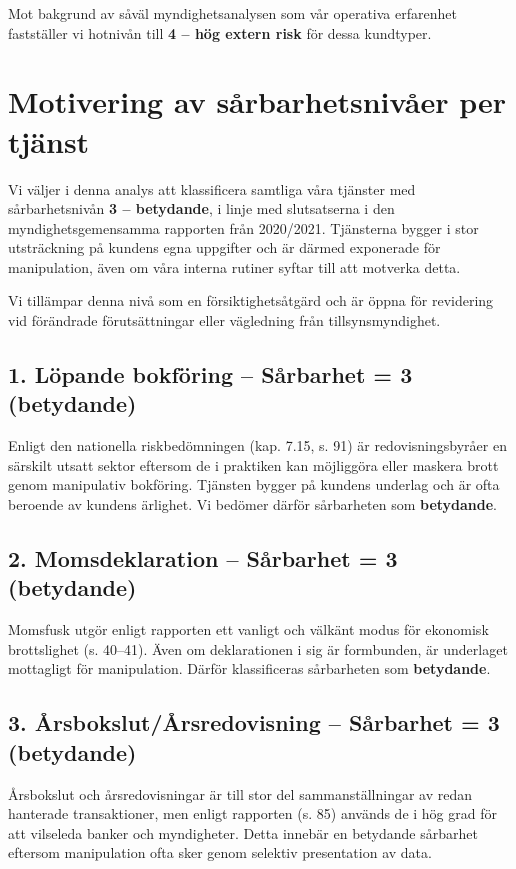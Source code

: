 \documentclass{article}
\begin{document}
Mot bakgrund av såväl myndighetsanalysen som vår operativa erfarenhet fastställer vi hotnivån till \textbf{4 – hög extern risk} för dessa kundtyper.





\newpage
\vspace{3em}
\section*{Motivering av sårbarhetsnivåer per tjänst}

Vi väljer i denna analys att klassificera samtliga våra tjänster med sårbarhetsnivån \textbf{3 – betydande}, i linje med slutsatserna i den myndighetsgemensamma rapporten från 2020/2021. Tjänsterna bygger i stor utsträckning på kundens egna uppgifter och är därmed exponerade för manipulation, även om våra interna rutiner syftar till att motverka detta. 

Vi tillämpar denna nivå som en försiktighetsåtgärd och är öppna för revidering vid förändrade förutsättningar eller vägledning från tillsynsmyndighet.


\subsection*{1. Löpande bokföring – Sårbarhet = 3 (betydande)}
Enligt den nationella riskbedömningen (kap. 7.15, s. 91) är redovisningsbyråer en särskilt utsatt sektor eftersom de i praktiken kan möjliggöra eller maskera brott genom manipulativ bokföring. Tjänsten bygger på kundens underlag och är ofta beroende av kundens ärlighet. Vi bedömer därför sårbarheten som \textbf{betydande}.

\subsection*{2. Momsdeklaration – Sårbarhet = 3 (betydande)}
Momsfusk utgör enligt rapporten ett vanligt och välkänt modus för ekonomisk brottslighet (s. 40–41). Även om deklarationen i sig är formbunden, är underlaget mottagligt för manipulation. Därför klassificeras sårbarheten som \textbf{betydande}.

\subsection*{3. Årsbokslut/Årsredovisning – Sårbarhet = 3 (betydande)}
Årsbokslut och årsredovisningar är till stor del sammanställningar av redan hanterade transaktioner, men enligt rapporten (s. 85) används de i hög grad för att vilseleda banker och myndigheter. Detta innebär en betydande sårbarhet eftersom manipulation ofta sker genom selektiv presentation av data.
\end{document}
